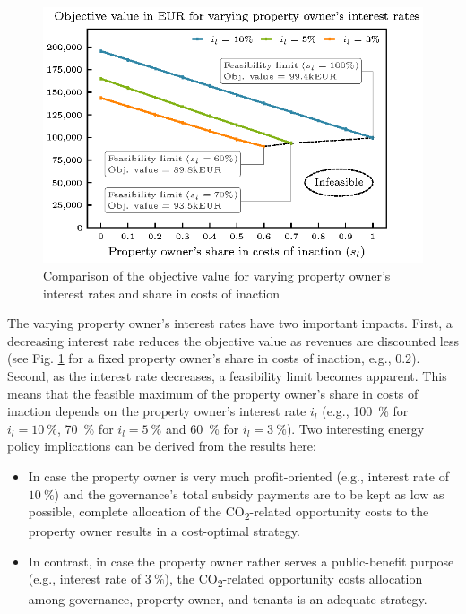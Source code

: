 \begin{figure}[h]
	\centering
	\includegraphics[width=0.7\linewidth]{figures/4_Results/fig_feasible/feasible.eps}
	\caption{Comparison of the objective value for varying property owner's interest rates and share in costs of inaction}
	\label{fig:feasible}
\end{figure}

The varying property owner's interest rates have two important impacts. First, a decreasing interest rate reduces the objective value as revenues are discounted less (see Fig. \ref{fig:feasible} for a fixed property owner's share in costs of inaction, e.g., $0.2$). Second, as the interest rate decreases, a feasibility limit becomes apparent. This means that the feasible maximum of the property owner's share in costs of inaction depends on the property owner's interest rate $i_l$ (e.g., \SI{100}{\%} for $i_l=\SI{10}{\%}$, \SI{70}{\%} for $i_l=\SI{5}{\%}$ and \SI{60}{\%} for $i_l=\SI{3}{\%}$). Two interesting energy policy implications can be derived from the results here:
\begin{itemize}
	\item In case the property owner is very much profit-oriented (e.g., interest rate of $\SI{10}{\%}$) and the governance's total subsidy payments are to be kept as low as possible, complete allocation of the CO\textsubscript{2}-related opportunity costs to the property owner results in a cost-optimal strategy.
	\item In contrast, in case the property owner rather serves a public-benefit purpose (e.g., interest rate of $\SI{3}{\%}$), the CO\textsubscript{2}-related opportunity costs allocation among governance, property owner, and tenants is an adequate strategy.
\end{itemize}



